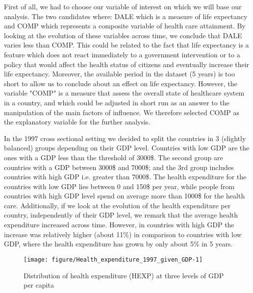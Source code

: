 \documentclass[12pt,a4paper]{article}\usepackage[]{graphicx}\usepackage[]{color}
\begin{document}
First of all, we had to choose our variable of interest on which we will base our analysis.  The two candidates where: DALE which is a measure of life expectancy and COMP which represents a composite variable of health care attainment. By looking at the evolution of these variables across time, we conclude that DALE varies less than COMP. This could be related to the fact that life expectancy is a feature which does not react immediately to a government intervention or to a policy that would affect the health status of citizens and eventually increase their life expectancy. Moreover, the available period in the dataset (5 years) is too short to allow us to conclude about an effect on life expectancy. However, the variable "COMP" is a measure that assess the overall state of healthcare system in a country, and which could be adjusted in  short run as an answer to the manipulation of the main factors of influence. We therefore selected  COMP as the explanatory variable for the further analysis.

\break
In the 1997 cross sectional setting we decided to split the countries in 3 (slightly balanced) groups depending on their GDP level. Countries with low GDP are the ones with a GDP less than the threshold of 3000\$. The second group are  countries with a GDP between 3000\$ and 7000\$; and the 3rd group includes  countries with high GDP i.e. greater than 7000\$.  
The health expenditure for the countries with low GDP lies between 0 and 150\$ per year, while people from countries with  high GDP level spend on average more than 1000\$ for the health care.  Additionally, if we look at the evolution of the health expenditure per country, independently of their GDP level, we remark that the average health expenditure increased across time. However, in countries with high GDP the increase was relatively higher (about 11\%) in comparison to countries with low GDP,  where the health expenditure has grown by only about 5\% in 5 years.


\begin{figure}[!htbp]

{\centering \texttt{[image: figure/Health\_expenditure\_1997\_given\_GDP-1]} 

}

\caption[Distribution of health expenditure (HEXP) at three levels of GDP per capita]{Distribution of health expenditure (HEXP) at three levels of GDP per capita}\label{fig:Health expenditure 1997 given GDP}
\end{figure}
\end{document}

